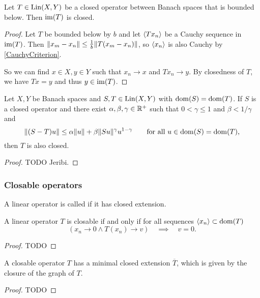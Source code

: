 \begin{proposition} \label{boundedBelowClosedRange}
Let $T\in \operatorname{Lin}(X, Y)$ be a closed operator between Banach spaces that is bounded below. Then $\operatorname{im}(T)$ is closed.
\end{proposition}
\begin{proof}
Let $T$ be bounded below by $b$ and let $\left\langle Tx_n \right\rangle$ be a Cauchy sequence in $\operatorname{im}(T)$. Then $\lVert x_m - x_n\rVert \leq \frac{1}{b}\lVert T(x_m - x_n)\rVert$, so $\left\langle x_n \right\rangle$ is also Cauchy by \ref{CauchyCriterion}.

So we can find $x\in X,y\in Y$ such that $x_n\to x$ and $Tx_n\to y$. By closedness of $T$, we have $Tx = y$ and thus $y\in\operatorname{im}(T)$.
\end{proof}

\begin{proposition}
Let $X,Y$ be Banach spaces and $S,T\in \operatorname{Lin}(X,Y)$ with $\operatorname{dom}(S) = \operatorname{dom}(T)$. If $S$ is a closed operator and there exist $\alpha,\beta,\gamma\in \mathbb{R}^+$ such that $0 < \gamma \leq 1$ and $\beta < 1/\gamma$ and
\[ \lVert(S-T)u\rVert \leq \alpha \lVert u\rVert + \beta\lVert Su\rVert^\gamma{u}^{1-\gamma} \qquad\text{for all $u\in \operatorname{dom}(S) = \operatorname{dom}(T)$,} \]
then $T$ is also closed.
\end{proposition}
\begin{proof}
TODO Jeribi.
\end{proof}

\subsubsection{Closable operators}
\begin{definition}
A linear operator is called  if it has closed extension.
\end{definition}

\begin{proposition} \label{closableCriterion}
A linear operator $T$ is closable \textup{if and only if} for all sequences $\left\langle x_n \right\rangle\subset\operatorname{dom}(T)$
\[ \left(x_n\to 0 \land T(x_n)\to v\right) \quad\implies\quad v = 0. \]
\end{proposition}
\begin{proof}
TODO
\end{proof}

\begin{lemma}
A closable operator $T$ has a minimal closed extension $\overline{T}$, which is given by the closure of the graph of $T$.
\end{lemma}
\begin{proof}
TODO
\end{proof}

